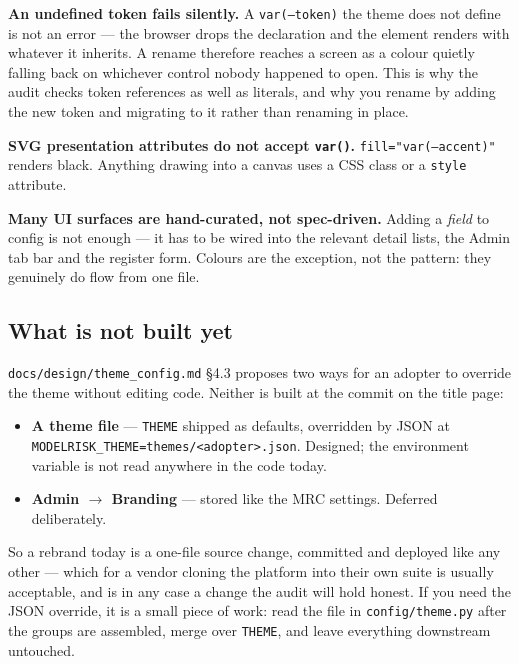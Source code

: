 \documentclass[11pt]{article}
\newcommand{\cfg}[1]{\texttt{#1}}
\begin{document}
\begin{note}
\textbf{An undefined token fails silently.} A \texttt{var(--token)} the theme does not
define is not an error --- the browser drops the declaration and the element renders with
whatever it inherits. A rename therefore reaches a screen as a colour quietly falling back
on whichever control nobody happened to open. This is why the audit checks token references
as well as literals, and why you rename by adding the new token and migrating to it rather
than renaming in place.

\textbf{SVG presentation attributes do not accept \texttt{var()}.}
\texttt{fill="var(--accent)"} renders black. Anything drawing into a canvas uses a CSS class
or a \texttt{style} attribute.

\textbf{Many UI surfaces are hand-curated, not spec-driven.} Adding a \emph{field} to
config is not enough --- it has to be wired into the relevant detail lists, the Admin tab
bar and the register form. Colours are the exception, not the pattern: they genuinely do
flow from one file.
\end{note}

\subsection{What is not built yet}

\texttt{docs/design/theme\_config.md} \S4.3 proposes two ways for an adopter to override the
theme without editing code. Neither is built at the commit on the title page:

\begin{itemize}
  \item \textbf{A theme file} --- \texttt{THEME} shipped as defaults, overridden by JSON at
        \cfg{MODELRISK\_THEME}\allowbreak\texttt{=themes/<adopter>.json}. Designed; the
        environment variable is not read anywhere in the code today.
  \item \textbf{Admin \(\rightarrow\) Branding} --- stored like the MRC settings. Deferred
        deliberately.
\end{itemize}

So a rebrand today is a one-file source change, committed and deployed like any other ---
which for a vendor cloning the platform into their own suite is usually acceptable, and is
in any case a change the audit will hold honest. If you need the JSON override, it is a
small piece of work: read the file in \texttt{config/theme.py} after the groups are
assembled, merge over \texttt{THEME}, and leave everything downstream untouched.
\end{document}
